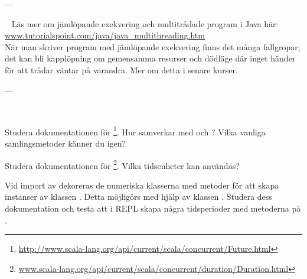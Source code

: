 \SOLUTION


\TaskSolved \what

---


\QUESTEND






\WHAT{}

\QUESTBEGIN

\Task  \what~ Läs mer om jämlöpande exekvering och multitrådade program i Java här: \href{http://www.tutorialspoint.com/java/java_multithreading.htm}{www.tutorialspoint.com/java/java\_multithreading.htm}  \\
\noindent När man skriver program med jämlöpande exekvering finns det många fallgropar; det kan bli kapplöpning  om gemensamma resurser och dödläge  där inget händer för att trådar väntar på varandra. Mer om detta i senare kurser.


\SOLUTION


\TaskSolved \what

---


\QUESTEND







\QUESTBEGIN

\Task  \what~\Pen

\Subtask Studera dokumentationen för \footnote{\href{http://www.scala-lang.org/api/current/scala/concurrent/Future.html}{http://www.scala-lang.org/api/current/scala/concurrent/Future.html}}. Hur samverkar  med  och ? Vilka vanliga samlingsmetoder känner du igen?

\Subtask Studera dokumentationen för \footnote{\href{http://www.scala-lang.org/api/current/scala/concurrent/duration/Duration.html}{www.scala-lang.org/api/current/scala/concurrent/duration/Duration.html}}. Vilka tidsenheter kan användas?

\Subtask Vid import av  dekoreras de numeriska klasserna med metoder för att skapa instanser av klassen . Detta möjligörs med hjälp av klassen . Studera dess dokumentation och testa att i REPL skapa några tidsperioder med metoderna på .



